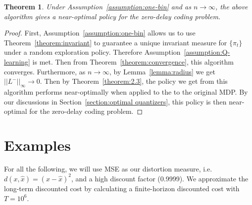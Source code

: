 \documentclass[conference]{IEEEtran}
\newtheorem{theorem}{Theorem}[section]
\begin{document}
\begin{theorem}
    Under Assumption~\ref{assumption:one-bin} and as \(n \to \infty\), the above algorithm gives a near-optimal policy for the zero-delay coding problem.
\end{theorem}
\begin{proof}
    First, Assumption~\ref{assumption:one-bin} allows us to use Theorem~\ref{theorem:invariant} to guarantee a unique invariant measure for \(\{\pi_t\}\) under a random exploration policy. Therefore Assumption~\ref{assumption:Q-learning} is met. Then from Theorem~\ref{theorem:convergence}, this algorithm converges. Furthermore, as \(n \to \infty\), by Lemma~\ref{lemma:radius} we get \(||L^-||_\infty \to 0\). Then by Theorem~\ref{theorem:2.3}, the policy we get from this algorithm performs near-optimally when applied to the to the original MDP. By our discussions in Section~\ref{section:optimal quantizers}, this policy is then near-optimal for the zero-delay coding problem.
\end{proof}

\section{Examples}
For all the following, we will use MSE as our distortion measure, i.e. \( d(x,\hat{x}) = (x - \hat{x})^2 \), and a high discount factor (0.9999). We approximate the long-term discounted cost by calculating a finite-horizon discounted cost with \(T=10^6\).
\end{document}
